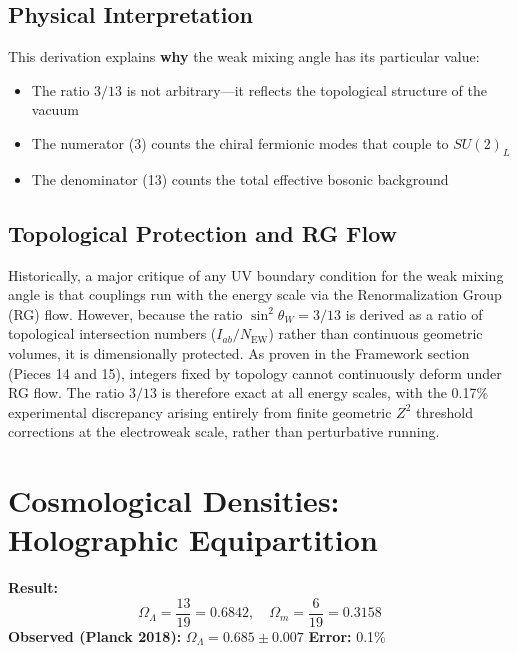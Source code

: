 \documentclass[12pt,a4paper]{article}
\newcommand{\OmegaL}{\Omega_\Lambda}
\newcommand{\OmegaM}{\Omega_m}
\newcommand{\sinW}{\sin^2\theta_W}
\newcommand{\Zsq}{Z^2}
\begin{document}
\subsection{Physical Interpretation}

This derivation explains \textbf{why} the weak mixing angle has its particular value:
\begin{itemize}
    \item The ratio $3/13$ is not arbitrary---it reflects the topological structure of the vacuum
    \item The numerator (3) counts the chiral fermionic modes that couple to $SU(2)_L$
    \item The denominator (13) counts the total effective bosonic background
\end{itemize}

\subsection{Topological Protection and RG Flow}

Historically, a major critique of any UV boundary condition for the weak mixing angle is that couplings run with the energy scale via the Renormalization Group (RG) flow. However, because the ratio $\sinW = 3/13$ is derived as a ratio of topological intersection numbers ($I_{ab} / N_{\text{EW}}$) rather than continuous geometric volumes, it is dimensionally protected. As proven in the Framework section (Pieces 14 and 15), integers fixed by topology cannot continuously deform under RG flow. The ratio $3/13$ is therefore exact at all energy scales, with the 0.17\% experimental discrepancy arising entirely from finite geometric $\Zsq$ threshold corrections at the electroweak scale, rather than perturbative running.

\section{Cosmological Densities: Holographic Equipartition}
\label{sec:cosmo}

\begin{derivedbox}
\textbf{Result:}
\begin{equation}
\OmegaL = \frac{13}{19} = 0.6842, \quad \OmegaM = \frac{6}{19} = 0.3158
\end{equation}
\textbf{Observed (Planck 2018):} $\OmegaL = 0.685 \pm 0.007$ \quad \textbf{Error:} 0.1\%
\end{derivedbox}
\end{document}
